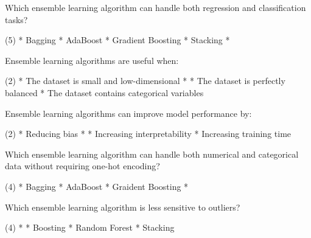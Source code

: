 \documentclass[10pt]{extarticle}
\begin{document}
\begin{exercise}
    Which ensemble learning algorithm can handle both regression and classification tasks?
    \begin{choice} (5)
        * Bagging
        * AdaBoost
        * Gradient Boosting
        * Stacking
        * 
    \end{choice}
\end{exercise}
\begin{solution}
\end{solution}

\begin{exercise}
    Ensemble learning algorithms are useful when:
    \begin{choice}(2)
        * The dataset is small and low-dimensional
        * 
        * The dataset is perfectly balanced
        * The dataset contains categorical variables
    \end{choice}
\end{exercise}
\begin{solution}
\end{solution}

\begin{exercise}
    Ensemble learning algorithms can improve model performance by:
    \begin{choice} (2)
        * Reducing bias
        * 
        * Increasing interpretability
        * Increasing training time
    \end{choice}
\end{exercise}
\begin{solution}
\end{solution}

\begin{exercise}
    Which ensemble learning algorithm can handle both numerical and categorical data without requiring one-hot encoding?
    \begin{choice} (4)
        * Bagging
        * AdaBoost
        * Graident Boosting
        * 
    \end{choice}
\end{exercise}
\begin{solution}
\end{solution}

\begin{exercise}
    Which ensemble learning algorithm is less sensitive to outliers?
    \begin{choice} (4)
        * 
        * Boosting
        * Random Forest
        * Stacking
    \end{choice}
\end{exercise}
\begin{solution}
\end{solution}
\end{document}
